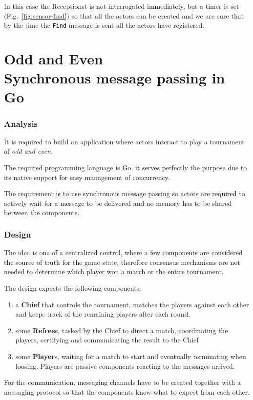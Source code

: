\documentclass{scrartcl}
\begin{document}
In this case the Receptionst is not interrogated immediately, but a timer is set (Fig.~\ref{fig:sensor-find})
so that all the actors can be created
and we are sure that by the time the \texttt{Find} message is sent all the actors have registered.

\clearpage
\part[Odd and Even]{Odd and Even \\\LARGE{Synchronous message passing in Go}}

\section{Analysis}
It is required to build an application where actors interact to play a tournament of \textit{odd and even}.

The required programming language is Go, it serves perfectly the purpose due to its native support for easy management of concurrency.

The requirement is to use synchronous message passing so actors are required to actively wait for a message to be delivered
and no memory has to be shared between the components.

\section{Design}
The idea is one of a centralized control, where a few components are considered the source of truth for the 
game state, therefore consensus mechanisms are not needed to determine which player won a match or the entire tournament.

The design expects the following components:
\begin{enumerate}
  \item a \textbf{Chief} that controls the tournament, matches the players against each other and keeps track of the
    remaining players after each round.
  \item some \textbf{Refree}s, tasked by the Chief to direct a match, coordinating the players, certifying and communicating
    the result to the Chief
  \item some \textbf{Player}s, waiting for a match to start and eventually terminating when loosing.
    Players are passive components reacting to the messages arrived.
\end{enumerate}

For the communication, messaging channels have to be created together with a messaging protocol so that the components know
what to expect from each other. 
\end{document}
